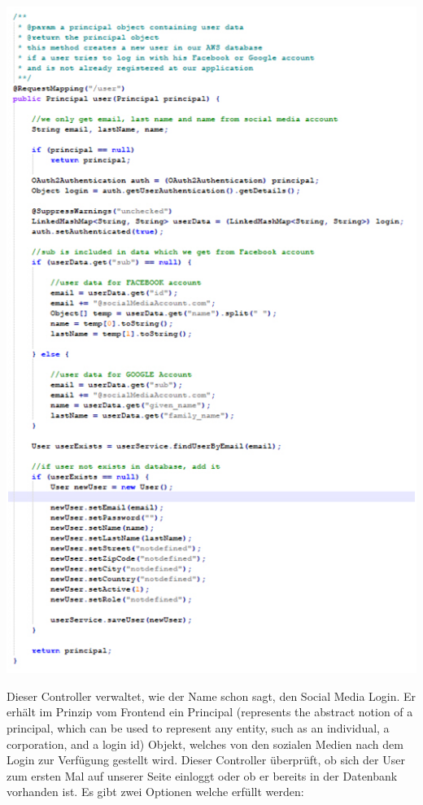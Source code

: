 \documentclass[12pt,a4paper]{article}
\begin{document}
\hspace{-5em} \includegraphics[width=1.1\textwidth]{./Graphics/bild4}

Dieser Controller verwaltet, wie der Name schon sagt, den Social Media Login. Er erhält im Prinzip vom Frontend ein Principal (represents the abstract notion of a principal, which can be used to represent any entity, such as an individual, a corporation, and a login id)  Objekt, welches von den sozialen Medien nach dem Login zur Verfügung gestellt wird.
Dieser Controller überprüft, ob sich der User zum ersten Mal auf unserer Seite einloggt oder ob er bereits in der Datenbank vorhanden ist.
Es gibt zwei Optionen welche erfüllt werden:
\end{document}
